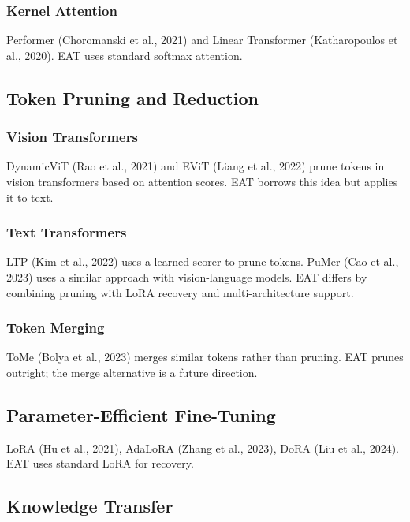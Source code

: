 \subsubsection{Kernel Attention}

Performer (Choromanski et al., 2021) and Linear Transformer (Katharopoulos 
et al., 2020). EAT uses standard softmax attention.

\subsection{Token Pruning and Reduction}

\subsubsection{Vision Transformers}

DynamicViT (Rao et al., 2021) and EViT (Liang et al., 2022) prune tokens in 
vision transformers based on attention scores. EAT borrows this idea but 
applies it to text.

\subsubsection{Text Transformers}

LTP (Kim et al., 2022) uses a learned scorer to prune tokens. PuMer (Cao et 
al., 2023) uses a similar approach with vision-language models. EAT differs 
by combining pruning with LoRA recovery and multi-architecture support.

\subsubsection{Token Merging}

ToMe (Bolya et al., 2023) merges similar tokens rather than pruning. EAT 
prunes outright; the merge alternative is a future direction.

\subsection{Parameter-Efficient Fine-Tuning}

LoRA (Hu et al., 2021), AdaLoRA (Zhang et al., 2023), DoRA (Liu et al., 2024). 
EAT uses standard LoRA for recovery.

\subsection{Knowledge Transfer}

